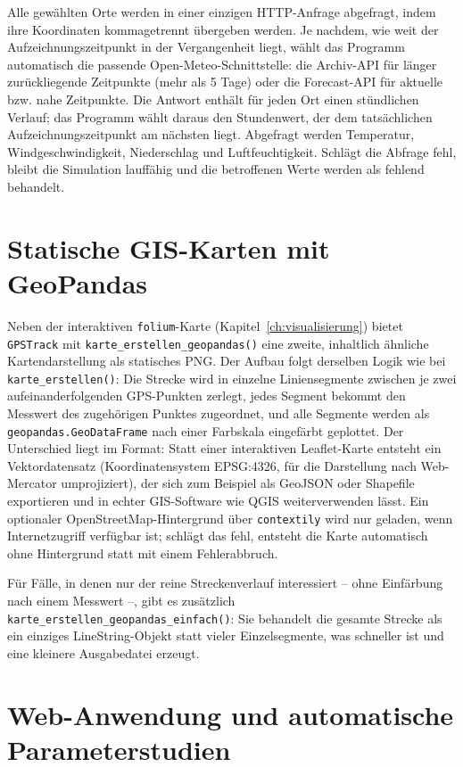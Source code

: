 Alle gewählten Orte werden in einer einzigen HTTP-Anfrage abgefragt, indem ihre Koordinaten kommagetrennt übergeben werden. Je nachdem, wie weit der Aufzeichnungszeitpunkt in der Vergangenheit liegt, wählt das Programm automatisch die passende Open-Meteo-Schnittstelle: die Archiv-API für länger zurückliegende Zeitpunkte (mehr als 5 Tage) oder die Forecast-API für aktuelle bzw. nahe Zeitpunkte. Die Antwort enthält für jeden Ort einen stündlichen Verlauf; das Programm wählt daraus den Stundenwert, der dem tatsächlichen Aufzeichnungszeitpunkt am nächsten liegt. Abgefragt werden Temperatur, Windgeschwindigkeit, Niederschlag und Luftfeuchtigkeit. Schlägt die Abfrage fehl, bleibt die Simulation lauffähig und die betroffenen Werte werden als fehlend behandelt.

\section{Statische GIS-Karten mit GeoPandas}

Neben der interaktiven \texttt{folium}-Karte (Kapitel~\ref{ch:visualisierung}) bietet \texttt{GPSTrack} mit \texttt{karte\_erstellen\_geopandas()} eine zweite, inhaltlich ähnliche Kartendarstellung als statisches PNG. Der Aufbau folgt derselben Logik wie bei \texttt{karte\_erstellen()}: Die Strecke wird in einzelne Liniensegmente zwischen je zwei aufeinanderfolgenden GPS-Punkten zerlegt, jedes Segment bekommt den Messwert des zugehörigen Punktes zugeordnet, und alle Segmente werden als \texttt{geopandas.GeoDataFrame} nach einer Farbskala eingefärbt geplottet. Der Unterschied liegt im Format: Statt einer interaktiven Leaflet-Karte entsteht ein Vektordatensatz (Koordinatensystem EPSG:4326, für die Darstellung nach Web-Mercator umprojiziert), der sich zum Beispiel als GeoJSON oder Shapefile exportieren und in echter GIS-Software wie QGIS weiterverwenden lässt. Ein optionaler OpenStreetMap-Hintergrund über \texttt{contextily} wird nur geladen, wenn Internetzugriff verfügbar ist; schlägt das fehl, entsteht die Karte automatisch ohne Hintergrund statt mit einem Fehlerabbruch.

Für Fälle, in denen nur der reine Streckenverlauf interessiert -- ohne Einfärbung nach einem Messwert --, gibt es zusätzlich \texttt{karte\_erstellen\_geopandas\_einfach()}: Sie behandelt die gesamte Strecke als ein einziges LineString-Objekt statt vieler Einzelsegmente, was schneller ist und eine kleinere Ausgabedatei erzeugt.

\section{Web-Anwendung und automatische Parameterstudien}

